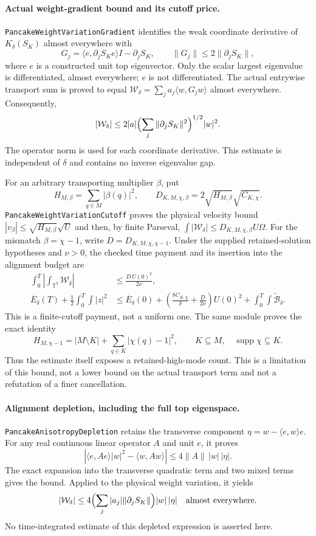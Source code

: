 \documentclass[11pt]{article}
\theoremstyle{definition}
\begin{document}
\paragraph{Actual weight-gradient bound and its cutoff price.}
\texttt{PancakeWeightVariationGradient} identifies the weak coordinate
derivative of $K_\delta(S_K)$ almost everywhere with
\[
 G_j=\langle e,\partial_jS_K e\rangle I-\partial_jS_K,
 \qquad \|G_j\|\le2\|\partial_jS_K\|,
\]
where $e$ is a constructed unit top eigenvector. Only the scalar largest
eigenvalue is differentiated, almost everywhere; $e$ is not differentiated.
The actual entrywise transport sum is proved to equal
$\mathcal W_\delta=\sum_j a_j\langle w,G_jw\rangle$ almost everywhere.
Consequently,
\[
 |\mathcal W_\delta|
 \le2|a|\Bigl(\sum_j\|\partial_jS_K\|^2\Bigr)^{1/2}|w|^2.
\]
The operator norm is used for each coordinate derivative. This estimate
is independent of $\delta$ and contains no inverse eigenvalue gap.

For an arbitrary transporting multiplier $\beta$, put
\[
 H_{M,\beta}=\sum_{q\in M}|\beta(q)|^2,
 \qquad D_{K,M,\chi,\beta}=2\sqrt{H_{M,\beta}}\sqrt{C_{K,\chi}}.
\]
\texttt{PancakeWeightVariationCutoff} proves the physical velocity bound
$|v_\beta|\le\sqrt{H_{M,\beta}}\sqrt U$ and then, by finite Parseval,
$\int|\mathcal W_\delta|\le D_{K,M,\chi,\beta}U\Omega$.
For the mismatch $\beta=\chi-1$, write $D=D_{K,M,\chi,\chi-1}$.
Under the supplied retained-solution hypotheses and $\nu>0$, the checked
time payment and its insertion into the alignment budget are
\[
 \begin{aligned}
 \int_0^T\left|\int_{\mathbb T^3}\mathcal W_\delta\right|
   &\le \frac{D\,U(0)^2}{2\nu},\\
 \overline E_\delta(T)+\frac12\int_0^T\!\int|z|^2
   &\le\overline E_\delta(0)
      +\left(\frac{8C_{K,\chi}}\delta+\frac{D}{2\nu}\right)U(0)^2
      +\int_0^T\!\int\widetilde{\mathcal B}_\delta.
 \end{aligned}
\]
This is a finite-cutoff payment, not a uniform one. The same module proves
the exact identity
\[
 H_{M,\chi-1}=|M\setminus K|+\sum_{q\in K}|\chi(q)-1|^2,
 \qquad K\subseteq M,\quad\operatorname{supp}\chi\subseteq K.
\]
Thus the estimate itself exposes a retained-high-mode count. This is a
limitation of this bound, not a lower bound on the actual transport term
and not a refutation of a finer cancellation.

\paragraph{Alignment depletion, including the full top eigenspace.}
\texttt{PancakeAnisotropyDepletion} retains the transverse component
$\eta=w-\langle e,w\rangle e$. For any real continuous linear operator $A$
and unit $e$, it proves
\[
 \left|\langle e,Ae\rangle|w|^2-\langle w,Aw\rangle\right|
       \le4\|A\|\,|w|\,|\eta|.
\]
The exact expansion into the transverse quadratic term and two mixed
terms gives the bound. Applied to the physical weight variation, it yields
\[
 |\mathcal W_\delta|
   \le4\Bigl(\sum_j|a_j|\|\partial_jS_K\|\Bigr)|w|\,|\eta|
 \quad\hbox{almost everywhere}.
\]
No time-integrated estimate of this depleted expression is asserted here.
\end{document}
